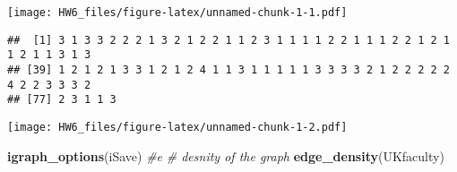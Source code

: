 \documentclass[
]{article}
\newenvironment{Shaded}{\begin{snugshade}}{\end{snugshade}}
\newcommand{\CommentTok}[1]{\textcolor[rgb]{0.56,0.35,0.01}{\textit{#1}}}
\newcommand{\DataTypeTok}[1]{\textcolor[rgb]{0.13,0.29,0.53}{#1}}
\newcommand{\DecValTok}[1]{\textcolor[rgb]{0.00,0.00,0.81}{#1}}
\newcommand{\KeywordTok}[1]{\textcolor[rgb]{0.13,0.29,0.53}{\textbf{#1}}}
\newcommand{\NormalTok}[1]{#1}
\newcommand{\OperatorTok}[1]{\textcolor[rgb]{0.81,0.36,0.00}{\textbf{#1}}}
\newcommand{\OtherTok}[1]{\textcolor[rgb]{0.56,0.35,0.01}{#1}}
\newcommand{\StringTok}[1]{\textcolor[rgb]{0.31,0.60,0.02}{#1}}
\begin{document}
\begin{Shaded}
\end{Shaded}

\texttt{[image: HW6\_files/figure-latex/unnamed-chunk-1-1.pdf]}

\begin{Shaded}
\end{Shaded}

\begin{verbatim}
##  [1] 3 1 3 3 2 2 2 1 3 2 1 2 2 1 1 2 3 1 1 1 1 2 2 1 1 1 2 2 1 2 1 1 2 1 1 3 1 3
## [39] 1 2 1 2 1 3 3 1 2 1 2 4 1 1 3 1 1 1 1 1 3 3 3 3 2 1 2 2 2 2 2 4 2 2 3 3 3 2
## [77] 2 3 1 1 3
\end{verbatim}

\begin{Shaded}
\end{Shaded}

\texttt{[image: HW6\_files/figure-latex/unnamed-chunk-1-2.pdf]}

\begin{Shaded}
\begin{Highlighting}[]
\KeywordTok{igraph_options}\NormalTok{(iSave)}
\CommentTok{#e}
\CommentTok{# desnity of the graph}
\KeywordTok{edge_density}\NormalTok{(UKfaculty)}
\end{Highlighting}
\end{Shaded}
\end{document}
